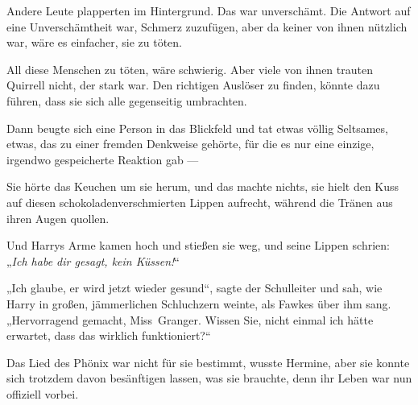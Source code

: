 Andere Leute plapperten im Hintergrund. Das war unverschämt. Die Antwort auf eine Unverschämtheit war, Schmerz zuzufügen, aber da keiner von ihnen nützlich war, wäre es einfacher, sie zu töten.

All diese Menschen zu töten, wäre schwierig. Aber viele von ihnen trauten Quirrell nicht, der stark war. Den richtigen Auslöser zu finden, könnte dazu führen, dass sie sich alle gegenseitig umbrachten.

Dann beugte sich eine Person in das Blickfeld und tat etwas völlig Seltsames, etwas, das zu einer fremden Denkweise gehörte, für die es nur eine einzige, irgendwo gespeicherte Reaktion gab —

\later

Sie hörte das Keuchen um sie herum, und das machte nichts, sie hielt den Kuss auf diesen schokoladenverschmierten Lippen aufrecht, während die Tränen aus ihren Augen quollen.

Und Harrys Arme kamen hoch und stießen sie weg, und seine Lippen schrien: „\emph{Ich habe dir gesagt, kein Küssen!}“

\later

„Ich glaube, er wird jetzt wieder gesund“, sagte der Schulleiter und sah, wie Harry in großen, jämmerlichen Schluchzern weinte, als Fawkes über ihm sang.
„Hervorragend gemacht, Miss~Granger. Wissen Sie, nicht einmal ich hätte erwartet, dass das wirklich funktioniert?“

Das Lied des Phönix war nicht für sie bestimmt, wusste Hermine, aber sie konnte sich trotzdem davon besänftigen lassen, was sie brauchte, denn ihr Leben war nun offiziell vorbei.


